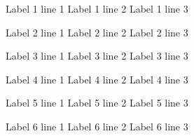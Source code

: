\documentclass[a4paper,14pt]{extarticle}
\begin{document}
\begin{labels}
Label 1 line 1
Label 1 line 2
Label 1 line 3

Label 2 line 1
Label 2 line 2
Label 2 line 3

Label 3 line 1
Label 3 line 2
Label 3 line 3

Label 4 line 1
Label 4 line 2
Label 4 line 3

Label 5 line 1
Label 5 line 2
Label 5 line 3

Label 6 line 1
Label 6 line 2
Label 6 line 3

\end{labels}
\end{document}
